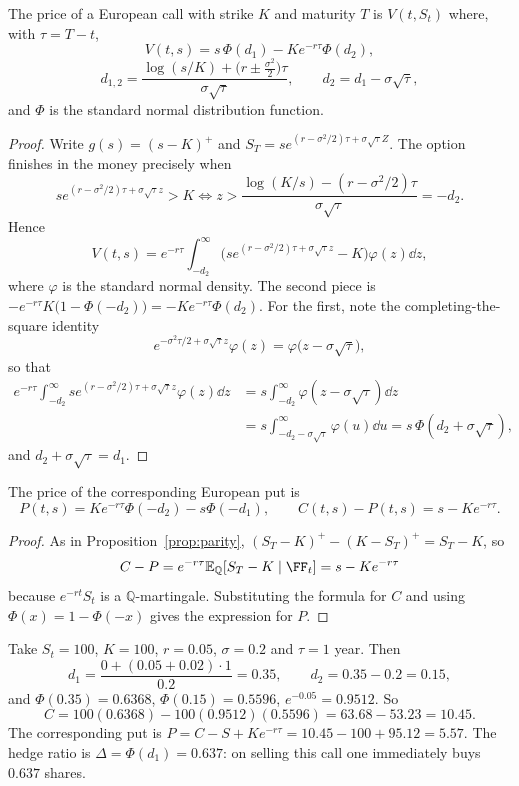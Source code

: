 \documentclass[a4paper]{scrartcl}
\newcommand{\QQ}{\mathbb{Q}}
\begin{document}
\begin{theorem}\label{thm:bs-formula}
	The price of a European call with strike $K$ and maturity $T$ is $V(t,S_t)$ where, with $\tau = T-t$,
	$$
	V(t,s) = s\,\Phi(d_1) - Ke^{-r\tau}\Phi(d_2),
	$$
	$$
	d_{1,2} = \frac{\log(s/K) + \big(r\pm\tfrac{\sigma^2}{2}\big)\tau}{\sigma\sqrt\tau}, \qquad d_2 = d_1 - \sigma\sqrt\tau,
	$$
	and $\Phi$ is the standard normal distribution function.
\end{theorem}

\begin{proof}
	Write $g(s) = (s-K)^+$ and $S_T = se^{(r-\sigma^2/2)\tau + \sigma\sqrt\tau Z}$. The option finishes in the money precisely when
	$$
	se^{(r-\sigma^2/2)\tau + \sigma\sqrt\tau z} > K \iff z > \frac{\log(K/s) - (r-\sigma^2/2)\tau}{\sigma\sqrt\tau} = -d_2.
	$$
	Hence
	$$
	V(t,s) = e^{-r\tau}\int_{-d_2}^\infty\Big(se^{(r-\sigma^2/2)\tau + \sigma\sqrt\tau z} - K\Big)\varphi(z)\dd z,
	$$
	where $\varphi$ is the standard normal density. The second piece is $-e^{-r\tau}K\big(1-\Phi(-d_2)\big) = -Ke^{-r\tau}\Phi(d_2)$. For the first, note the completing-the-square identity
	$$
	e^{-\sigma^2\tau/2 + \sigma\sqrt\tau z}\varphi(z) = \varphi\big(z - \sigma\sqrt\tau\big),
	$$
	so that
	\begin{align*}
		e^{-r\tau}\int_{-d_2}^\infty se^{(r-\sigma^2/2)\tau+\sigma\sqrt\tau z}\varphi(z)\dd z &= s\int_{-d_2}^\infty \varphi(z-\sigma\sqrt\tau)\dd z\\
		&= s\int_{-d_2-\sigma\sqrt\tau}^\infty\varphi(u)\dd u = s\,\Phi(d_2+\sigma\sqrt\tau),
	\end{align*}
	and $d_2 + \sigma\sqrt\tau = d_1$.
\end{proof}

\begin{corollary}
	The price of the corresponding European put is
	$$
	P(t,s) = Ke^{-r\tau}\Phi(-d_2) - s\Phi(-d_1), \qquad C(t,s) - P(t,s) = s - Ke^{-r\tau}.
	$$
\end{corollary}

\begin{proof}
	As in Proposition~\ref{prop:parity}, $(S_T-K)^+ - (K-S_T)^+ = S_T-K$, so
	$$
	C - P = e^{-r\tau}\EE_\QQ[S_T - K\mid\FF_t] = s - Ke^{-r\tau}
	$$
	because $e^{-rt}S_t$ is a $\QQ$-martingale. Substituting the formula for $C$ and using $\Phi(x) = 1-\Phi(-x)$ gives the expression for $P$.
\end{proof}

\begin{example}\label{ex:bs-numeric}
	Take $S_t = 100$, $K = 100$, $r = 0.05$, $\sigma = 0.2$ and $\tau = 1$ year. Then
	$$
	d_1 = \frac{0 + (0.05+0.02)\cdot1}{0.2} = 0.35, \qquad d_2 = 0.35 - 0.2 = 0.15,
	$$
	and $\Phi(0.35) = 0.6368$, $\Phi(0.15) = 0.5596$, $e^{-0.05} = 0.9512$. So
	$$
	C = 100(0.6368) - 100(0.9512)(0.5596) = 63.68 - 53.23 = 10.45.
	$$
	The corresponding put is $P = C - S + Ke^{-r\tau} = 10.45 - 100 + 95.12 = 5.57$. The hedge ratio is $\Delta = \Phi(d_1) = 0.637$: on selling this call one immediately buys $0.637$ shares.
\end{example}
\end{document}
